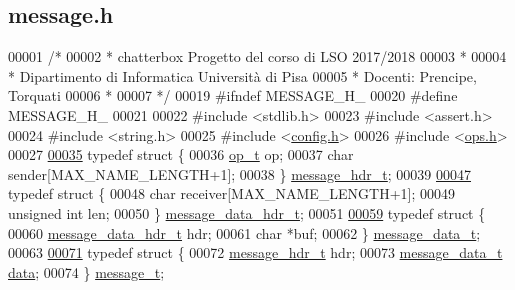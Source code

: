 \hypertarget{message_8h_source}{}\subsection{message.\+h}

\begin{DoxyCode}
00001 \textcolor{comment}{/*}
00002 \textcolor{comment}{ * chatterbox Progetto del corso di LSO 2017/2018}
00003 \textcolor{comment}{ *}
00004 \textcolor{comment}{ * Dipartimento di Informatica Università di Pisa}
00005 \textcolor{comment}{ * Docenti: Prencipe, Torquati}
00006 \textcolor{comment}{ *}
00007 \textcolor{comment}{ */}
00019 \textcolor{preprocessor}{#ifndef MESSAGE\_H\_}
00020 \textcolor{preprocessor}{#define MESSAGE\_H\_}
00021 
00022 \textcolor{preprocessor}{#include <stdlib.h>}
00023 \textcolor{preprocessor}{#include <assert.h>}
00024 \textcolor{preprocessor}{#include <string.h>}
00025 \textcolor{preprocessor}{#include <\mbox{\hyperlink{config_8h}{config.h}}>}
00026 \textcolor{preprocessor}{#include <\mbox{\hyperlink{ops_8h}{ops.h}}>}
00027 
\mbox{\hyperlink{structmessage__hdr__t}{00035}} \textcolor{keyword}{typedef} \textcolor{keyword}{struct }\{
00036         \mbox{\hyperlink{ops_8h_ac6fa1b34da8872e34c2936391332f44c}{op\_t}} op;
00037         \textcolor{keywordtype}{char} sender[MAX\_NAME\_LENGTH+1];
00038 \} \mbox{\hyperlink{structmessage__hdr__t}{message\_hdr\_t}};
00039 
\mbox{\hyperlink{structmessage__data__hdr__t}{00047}} \textcolor{keyword}{typedef} \textcolor{keyword}{struct }\{
00048         \textcolor{keywordtype}{char} receiver[MAX\_NAME\_LENGTH+1];
00049         \textcolor{keywordtype}{unsigned} \textcolor{keywordtype}{int} len;
00050 \} \mbox{\hyperlink{structmessage__data__hdr__t}{message\_data\_hdr\_t}};
00051 
\mbox{\hyperlink{structmessage__data__t}{00059}} \textcolor{keyword}{typedef} \textcolor{keyword}{struct }\{
00060         \mbox{\hyperlink{structmessage__data__hdr__t}{message\_data\_hdr\_t}} hdr;
00061         \textcolor{keywordtype}{char}               *buf;
00062 \} \mbox{\hyperlink{structmessage__data__t}{message\_data\_t}};
00063 
\mbox{\hyperlink{structmessage__t}{00071}} \textcolor{keyword}{typedef} \textcolor{keyword}{struct }\{
00072         \mbox{\hyperlink{structmessage__hdr__t}{message\_hdr\_t}} hdr;
00073         \mbox{\hyperlink{structmessage__data__t}{message\_data\_t}} \mbox{\hyperlink{structdata}{data}};
00074 \} \mbox{\hyperlink{structmessage__t}{message\_t}};

\end{DoxyCode}
